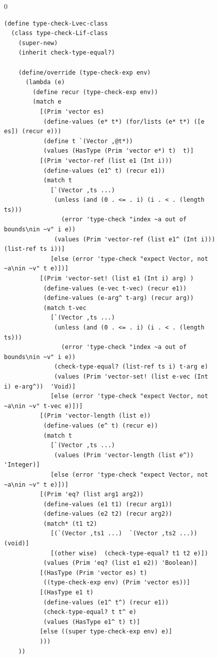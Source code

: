 \documentclass[7x10]{TimesAPriori_MIT}%
\def\racketEd{0}
\def\edition{0}
\numberwithin{theorem}{chapter}
\numberwithin{definition}{chapter}
\numberwithin{equation}{chapter}
\begin{document}
\begin{figure}[tp]
  \begin{tcolorbox}[colback=white]
    {\if\edition\racketEd
\begin{lstlisting}[basicstyle=\ttfamily\scriptsize]
(define type-check-Lvec-class
  (class type-check-Lif-class
    (super-new)
    (inherit check-type-equal?)

    (define/override (type-check-exp env)
      (lambda (e)
        (define recur (type-check-exp env))
        (match e
          [(Prim 'vector es)
           (define-values (e* t*) (for/lists (e* t*) ([e es]) (recur e)))
           (define t `(Vector ,@t*))
           (values (HasType (Prim 'vector e*) t)  t)]
          [(Prim 'vector-ref (list e1 (Int i)))
           (define-values (e1^ t) (recur e1))
           (match t
             [`(Vector ,ts ...)
              (unless (and (0 . <= . i) (i . < . (length ts)))
                (error 'type-check "index ~a out of bounds\nin ~v" i e))
              (values (Prim 'vector-ref (list e1^ (Int i)))  (list-ref ts i))]
             [else (error 'type-check "expect Vector, not ~a\nin ~v" t e)])]
          [(Prim 'vector-set! (list e1 (Int i) arg) )
           (define-values (e-vec t-vec) (recur e1))
           (define-values (e-arg^ t-arg) (recur arg))
           (match t-vec
             [`(Vector ,ts ...)
              (unless (and (0 . <= . i) (i . < . (length ts)))
                (error 'type-check "index ~a out of bounds\nin ~v" i e))
              (check-type-equal? (list-ref ts i) t-arg e)
              (values (Prim 'vector-set! (list e-vec (Int i) e-arg^))  'Void)]
             [else (error 'type-check "expect Vector, not ~a\nin ~v" t-vec e)])]
          [(Prim 'vector-length (list e))
           (define-values (e^ t) (recur e))
           (match t
             [`(Vector ,ts ...)
              (values (Prim 'vector-length (list e^))  'Integer)]
             [else (error 'type-check "expect Vector, not ~a\nin ~v" t e)])]
          [(Prim 'eq? (list arg1 arg2))
           (define-values (e1 t1) (recur arg1))
           (define-values (e2 t2) (recur arg2))
           (match* (t1 t2)
             [(`(Vector ,ts1 ...)  `(Vector ,ts2 ...))  (void)]
             [(other wise)  (check-type-equal? t1 t2 e)])
           (values (Prim 'eq? (list e1 e2)) 'Boolean)]
          [(HasType (Prim 'vector es) t)
           ((type-check-exp env) (Prim 'vector es))]
          [(HasType e1 t)
           (define-values (e1^ t^) (recur e1))
           (check-type-equal? t t^ e)
           (values (HasType e1^ t) t)]
          [else ((super type-check-exp env) e)]
          )))
    ))


\end{lstlisting}}
\end{tcolorbox}
\end{figure}
\end{document}
